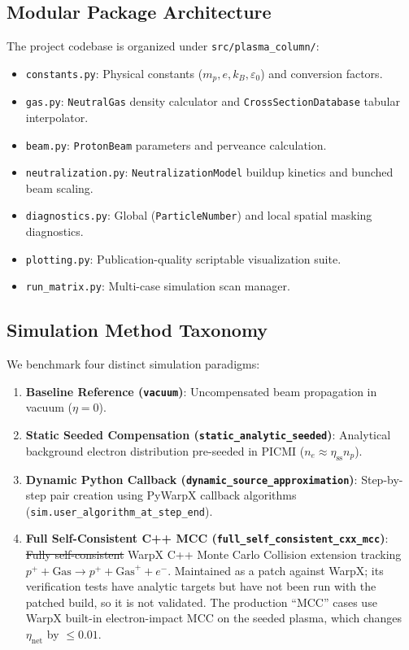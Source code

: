 \documentclass[11pt,a4paper]{article}
\newcommand{\old}[1]{\textcolor{red!70!black}{\sout{#1}}}
\newcommand{\new}[1]{\textcolor{blue!60!black}{#1}}
\begin{document}
\subsection{Modular Package Architecture}
The project codebase is organized under \texttt{src/plasma\_column/}:
\begin{itemize}
    \item \texttt{constants.py}: Physical constants ($m_p, e, k_B, \varepsilon_0$) and conversion factors.
    \item \texttt{gas.py}: \texttt{NeutralGas} density calculator and \texttt{CrossSectionDatabase} tabular interpolator.
    \item \texttt{beam.py}: \texttt{ProtonBeam} parameters and perveance calculation.
    \item \texttt{neutralization.py}: \texttt{NeutralizationModel} buildup kinetics and bunched beam scaling.
    \item \texttt{diagnostics.py}: Global (\texttt{ParticleNumber}) and local spatial masking diagnostics.
    \item \texttt{plotting.py}: Publication-quality scriptable visualization suite.
    \item \texttt{run\_matrix.py}: Multi-case simulation scan manager.
\end{itemize}

\subsection{Simulation Method Taxonomy}
We benchmark four distinct simulation paradigms:
\begin{enumerate}
    \item \textbf{Baseline Reference (\texttt{vacuum})}: Uncompensated beam propagation in vacuum ($\eta = 0$).
    \item \textbf{Static Seeded Compensation (\texttt{static\_analytic\_seeded})}: Analytical background electron distribution pre-seeded in PICMI ($n_e \approx \eta_{\text{ss}} n_p$).
    \item \textbf{Dynamic Python Callback (\texttt{dynamic\_source\_approximation})}: Step-by-step pair creation using PyWarpX callback algorithms (\texttt{sim.user\_algorithm\_at\_step\_end}).
    \item \textbf{Full Self-Consistent C++ MCC (\texttt{full\_self\_consistent\_cxx\_mcc})}: \old{Fully self-consistent} WarpX C++ Monte Carlo Collision extension tracking $p^+ + \text{Gas} \rightarrow p^+ + \text{Gas}^+ + e^-$. \new{Maintained as a patch against WarpX; its verification tests have analytic targets but have not been run with the patched build, so it is not validated. The production ``MCC'' cases use WarpX built-in electron-impact MCC on the seeded plasma, which changes $\eta_{\text{net}}$ by $\le 0.01$.}
\end{enumerate}
\end{document}
